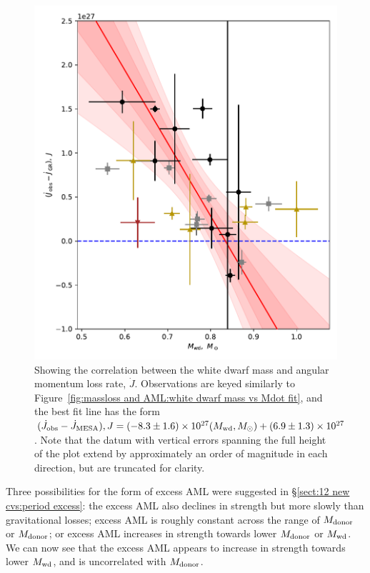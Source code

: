 \begin{figure}
    \centering
    \includegraphics[width=\textwidth]{figures/results/Mdot/Mwd_Jdot_ex.pdf}
    \caption{Showing the correlation between the white dwarf mass and angular momentum loss rate, $\dot J$. Observations are keyed similarly to Figure~\ref{fig:massloss and AML:white dwarf mass vs Mdot fit}, and the best fit line has the form $(\dot J_{\rm obs} - \dot J_{\rm MESA}), J = (-8.3\pm1.6) \times 10^{27}(M_{\rm wd}, M_\odot) + (6.9\pm1.3)\times10^{27}$. Note that the datum with vertical errors spanning the full height of the plot extend by approximately an order of magnitude in each direction, but are truncated for clarity.}
    \label{fig:massloss and AML:white dwarf mass vs Jdot fit}
\end{figure}


Three possibilities for the form of excess AML were suggested in \S\ref{sect:12 new cvs:period excess}: the excess AML also declines in strength but more slowly than gravitational losses; excess AML is roughly constant across the range of $M_{\rm donor}$ or $M_{\rm donor}$; or excess AML increases in strength towards lower $M_{\rm donor}$ or $M_{\rm wd}$.
We can now see that the excess AML appears to increase in strength towards lower $M_{\rm wd}$, and is uncorrelated with $M_{\rm donor}$.

